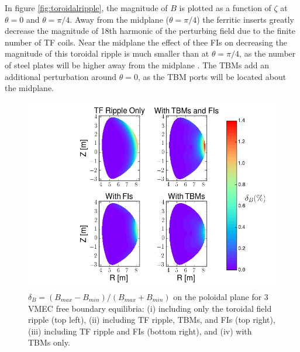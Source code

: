 \documentclass{article}
\begin{document}
In figure \ref{fig:toroidalripple}, the magnitude of $B$ is plotted as a function of $\zeta$ at $\theta = 0$ and $\theta = \pi/4$. Away from the midplane ($\theta = \pi/4$) the ferritic inserts greatly decrease the magnitude of 18th harmonic of the perturbing field due to the finite number of TF coils. Near the midplane the effect of thee FIs on decreasing the magnitude of this toroidal ripple is much smaller than at $\theta = \pi/4$, as the number of steel plates will be higher away from the midplane \cite{Shinohara2009}. The TBMs add an additional perturbation around $\theta = 0$, as the TBM ports will be located about the midplane. 

\FloatBarrier

\begin{figure}[h!]
\centering
\includegraphics[width=1\textwidth]{ripplecontour.png}
\caption{\label{fig:ripplecontour} $\delta_B = (B_{max}-B_{min})/(B_{max} + B_{min})$ on the poloidal plane for 3 VMEC free boundary equilibria: (i) including only the toroidal field ripple (top left), (ii) including TF ripple, TBMs, and FIs (top right), (iii) including TF ripple and FIs (bottom right), and (iv) with TBMs only.}
\end{figure}
\end{document}
